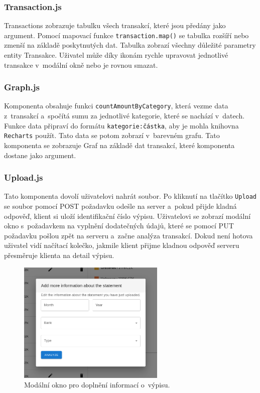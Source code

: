 \subsubsection{Transaction.js}
Transactions zobrazuje tabulku všech transakcí, které jsou předány jako argument. Pomocí mapovací funkce \texttt{transaction.map()} se tabulka rozšíří nebo zmenší na základě poskytnutých dat. Tabulka zobrazí všechny důležité parametry entity Transakce. Uživatel může díky ikonám rychle upravovat jednotlivé transakce v~modální okně nebo je rovnou smazat.

\subsubsection{Graph.js}
Komponenta obsahuje funkci \texttt{countAmountByCategory}, která vezme data z~transakcí a~spočítá sumu za jednotlivé kategorie, které se nachází v~datech. Funkce data připraví do formátu \texttt{kategorie:částka}, aby je mohla knihovna \texttt{Recharts} použít. Tato data se potom zobrazí v~barevném grafu. 
Tato komponenta se zobrazuje Graf na základě dat transakcí, které komponenta dostane jako argument. 

\subsubsection{Upload.js}
Tato komponenta dovolí uživatelovi nahrát soubor. Po kliknutí na tlačítko \texttt{Upload} se soubor pomocí POST požadavku odešle na server a~pokud přijde kladná odpověď, klient si uloží identifikační číslo výpisu. Uživatelovi se zobrazí modální okno s~požadavkem na vyplnění dodatečných údajů, které se pomocí PUT požadavku pošlou zpět na serveru a~začne analýza transakcí. Dokud není hotova uživatel vidí načítací kolečko, jakmile klient přijme kladnou odpověď serveru přesměruje klienta na detail výpisu.
\begin{figure}[H]
    \centering
    \includegraphics[width=7cm]{obrazky-figures/moneymodalwindow.png}
    \caption{Modální okno pro doplnění informací o~výpisu.}
    \label{fig:statements}
\end{figure}


